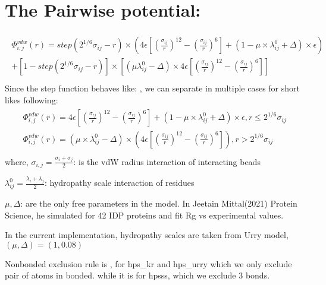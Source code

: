 \documentclass[letterpaper,10pt,english]{sphinxmanual}
\begin{document}
\section{The Pairwise potential:}
\label{\detokenize{modules/models:the-pairwise-potential}}\begin{align*}\!\begin{aligned}
\Phi_{i,j}^{vdw}(r) = step(2^{1/6}\sigma_{ij}-r) \times \left( 4\epsilon\left[\left(\frac{\sigma_{ij}}{r}\right)^{12}- \left(\frac{\sigma_{ij}}{r}\right)^{6}\right]+(1-\mu\times\lambda_{ij}^{0}+\Delta)\times\epsilon\right)\\
+ \left[1-step(2^{1/6}\sigma_{ij}-r)\right]\times\left[(\mu \lambda_{ij}^{0}-\Delta)\times 4\epsilon \left[\left(\frac{\sigma_{ij}}{r}\right)^{12}-\left(\frac{\sigma_{ij}}{r}\right)^6\right]\right]\\
\end{aligned}\end{align*}
\sphinxAtStartPar
Since the step function behaves like: , we can separate in multiple cases for short likes following:
\begin{align*}\!\begin{aligned}
\Phi_{i,j}^{vdw}(r) =  4\epsilon \left[\left(\frac{\sigma_{ij}}{r}\right)^{12}-\left(\frac{\sigma_{ij}}{r}\right)^{6}\right]+(1-\mu     \times\lambda_{ij}^{0}+\Delta)  \times\epsilon, r\le 2^{1/6}\sigma_{ij}\\
\Phi_{i,j}^{vdw}(r) = (\mu\times\lambda_{ij}^{0}-\Delta) \times \left( 4\epsilon \left[\left(\frac{\sigma_{ij}}{r}\right)^{12}-\left(\frac{\sigma_{ij}}{r}\right)^{6}\right]\right), r > 2^{1/6}\sigma_{ij}\\
\end{aligned}\end{align*}
\sphinxAtStartPar
where, \(\sigma_{i,j}=\frac{\sigma_i+\sigma_j}{2}\): is the vdW radius interaction of interacting beads

\sphinxAtStartPar
\(\lambda_{ij}^{0}=\frac{\lambda_i+\lambda_j}{2}\): hydropathy scale interaction of residues

\sphinxAtStartPar
\(\mu, \Delta\): are the only free parameters in the model. In Jeetain Mittal(2021) Protein Science, he simulated for 42 IDP proteins and fit Rg vs experimental values.

\sphinxAtStartPar
In the current implementation, hydropathy scales are taken from Urry model, \((\mu, \Delta) = (1, 0.08)\)

\sphinxAtStartPar
Nonbonded exclusion rule is , for hps\_kr and hps\_urry which we only exclude pair of atoms in bonded.
while it is  for hps\sphinxhyphen{}ss, which we exclude 3 bonds.
\end{document}
